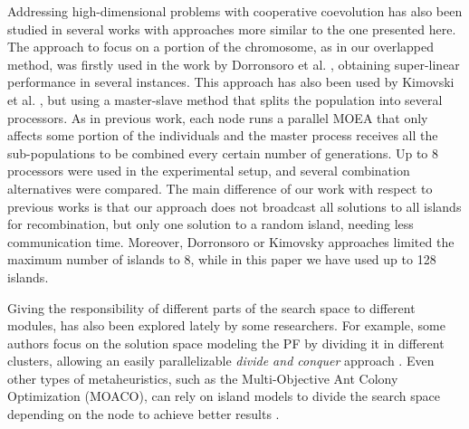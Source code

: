 \documentclass[preprint]{elsarticle}
\begin{document}
Addressing high-dimensional problems with cooperative coevolution has also been studied in several works with approaches more similar to the one presented here.
The approach to focus on a portion of the chromosome, as in our overlapped method, was firstly used in the work by Dorronsoro et al. \citep{Dorronsoro13superlinear}, obtaining super-linear performance
in several instances. This approach has also been used by Kimovski et al. \citep{Kimovski15Parallel}, but using a
master-slave method that splits the population into several processors. As in previous work, each node
runs a parallel MOEA that only affects some portion of 
the individuals and the master
process receives all the sub-populations to be combined every certain number of generations. Up to 8 processors
were used in the experimental setup, and several
combination alternatives were compared. The main difference of our work with respect to previous works is that our approach does not 
broadcast all solutions to all islands for recombination, but only one solution to a random island, needing less
communication time. Moreover, Dorronsoro or Kimovsky approaches limited the maximum number of islands to 8, while in this paper we have
used up to 128 islands. 


Giving the responsibility of different parts of the search space to different modules, has also been explored lately by some researchers. For example, some authors focus on the solution space modeling the PF by dividing it in different clusters, allowing an easily parallelizable {\em divide and conquer} approach \citep{cheng2015adaptive}. Even other types of metaheuristics, such as the Multi-Objective Ant Colony Optimization (MOACO), can rely on island models to divide the search space depending on the node to achieve better results \cite{Mora13Moacos}.
\end{document}

